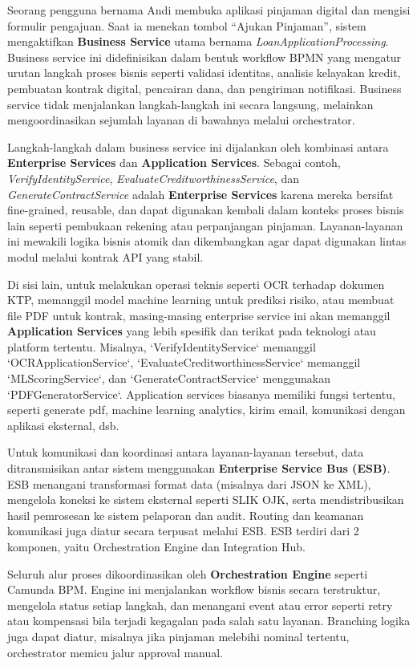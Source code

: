 Seorang pengguna bernama Andi membuka aplikasi pinjaman digital dan mengisi formulir pengajuan. Saat ia menekan tombol “Ajukan Pinjaman”, sistem mengaktifkan \textbf{Business Service} utama bernama \textit{LoanApplicationProcessing}. Business service ini didefinisikan dalam bentuk workflow BPMN yang mengatur urutan langkah proses bisnis seperti validasi identitas, analisis kelayakan kredit, pembuatan kontrak digital, pencairan dana, dan pengiriman notifikasi. Business service tidak menjalankan langkah-langkah ini secara langsung, melainkan mengoordinasikan sejumlah layanan di bawahnya melalui orchestrator.

Langkah-langkah dalam business service ini dijalankan oleh kombinasi antara \textbf{Enterprise Services} dan \textbf{Application Services}. Sebagai contoh, \textit{VerifyIdentityService}, \textit{EvaluateCreditworthinessService}, dan \textit{GenerateContractService} adalah \textbf{Enterprise Services} karena mereka bersifat fine-grained, reusable, dan dapat digunakan kembali dalam konteks proses bisnis lain seperti pembukaan rekening atau perpanjangan pinjaman. Layanan-layanan ini mewakili logika bisnis atomik dan dikembangkan agar dapat digunakan lintas modul melalui kontrak API yang stabil.

Di sisi lain, untuk melakukan operasi teknis seperti OCR terhadap dokumen KTP, memanggil model machine learning untuk prediksi risiko, atau membuat file PDF untuk kontrak, masing-masing enterprise service ini akan memanggil \textbf{Application Services} yang lebih spesifik dan terikat pada teknologi atau platform tertentu. Misalnya, `VerifyIdentityService` memanggil `OCRApplicationService`, `EvaluateCreditworthinessService` memanggil `MLScoringService`, dan `GenerateContractService` menggunakan `PDFGeneratorService`. Application services biasanya memiliki fungsi tertentu, seperti generate pdf, machine learning analytics, kirim email, komunikasi dengan aplikasi eksternal, dsb.

Untuk komunikasi dan koordinasi antara layanan-layanan tersebut, data ditransmisikan antar sistem menggunakan \textbf{Enterprise Service Bus (ESB)}. ESB menangani transformasi format data (misalnya dari JSON ke XML), mengelola koneksi ke sistem eksternal seperti SLIK OJK, serta mendistribusikan hasil pemrosesan ke sistem pelaporan dan audit. Routing dan keamanan komunikasi juga diatur secara terpusat melalui ESB. ESB terdiri dari 2 komponen, yaitu Orchestration Engine dan Integration Hub.

Seluruh alur proses dikoordinasikan oleh \textbf{Orchestration Engine} seperti Camunda BPM. Engine ini menjalankan workflow bisnis secara terstruktur, mengelola status setiap langkah, dan menangani event atau error seperti retry atau kompensasi bila terjadi kegagalan pada salah satu layanan. Branching logika juga dapat diatur, misalnya jika pinjaman melebihi nominal tertentu, orchestrator memicu jalur approval manual.

